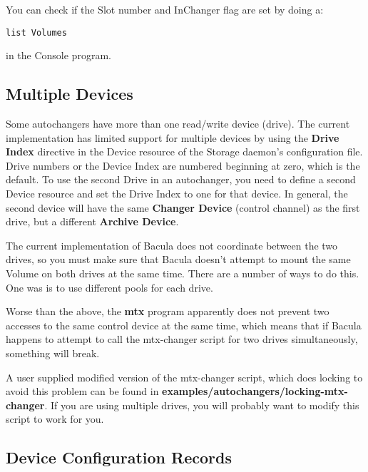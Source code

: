 You can check if the Slot number and InChanger flag are set by doing a:
\begin{verbatim}
list Volumes
\end{verbatim}

in the Console program.

\label{mult}

\subsection*{Multiple Devices}

Some autochangers have more than one read/write device (drive). The current
implementation has limited support for multiple devices by using the {\bf
Drive Index} directive in the Device resource of the Storage daemon's
configuration file. Drive numbers or the Device Index are numbered beginning
at zero, which is the default. To use the second Drive in an autochanger, you
need to define a second Device resource and set the Drive Index to one for
that device. In general, the second device will have the same {\bf Changer
Device} (control channel) as the first drive, but a different {\bf Archive
Device}. 

The current implementation of Bacula does not coordinate between the two
drives, so you must make sure that Bacula doesn't attempt to mount the same
Volume on both drives at the same time. There are a number of ways to do this.
One was is to use different pools for each drive. 

Worse than the above, the {\bf mtx} program apparently does not prevent two
accesses to the same control device at the same time, which means that if
Bacula happens to attempt to call the mtx-changer script for two drives
simultaneously, something will break. 

A user supplied modified version of the mtx-changer script, which does locking
to avoid this problem can be found in {\bf
examples/autochangers/locking-mtx-changer}. If you are using multiple drives,
you will probably want to modify this script to work for you. 
\label{ConfigRecords}

\subsection*{Device Configuration Records}

